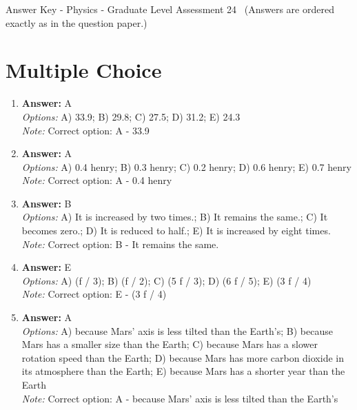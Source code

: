 \documentclass[12pt]{article}
\begin{document}
\begin{center}
Answer Key - Physics - Graduate Level Assessment 24 \
\small (Answers are ordered exactly as in the question paper.)
\end{center}

\section*{Multiple Choice}
\begin{enumerate}[label=\arabic*.]
\item \textbf{Answer:} A
\\ \textit{Options:} A) 33.9; B) 29.8; C) 27.5; D) 31.2; E) 24.3
\\ \textit{Note:} Correct option: A - 33.9
\item \textbf{Answer:} A
\\ \textit{Options:} A) 0.4 henry; B) 0.3 henry; C) 0.2 henry; D) 0.6 henry; E) 0.7 henry
\\ \textit{Note:} Correct option: A - 0.4 henry
\item \textbf{Answer:} B
\\ \textit{Options:} A) It is increased by two times.; B) It remains the same.; C) It becomes zero.; D) It is reduced to half.; E) It is increased by eight times.
\\ \textit{Note:} Correct option: B - It remains the same.
\item \textbf{Answer:} E
\\ \textit{Options:} A) (f / 3); B) (f / 2); C) (5 f / 3); D) (6 f / 5); E) (3 f / 4)
\\ \textit{Note:} Correct option: E - (3 f / 4)
\item \textbf{Answer:} A
\\ \textit{Options:} A) because Mars' axis is less tilted than the Earth's; B) because Mars has a smaller size than the Earth; C) because Mars has a slower rotation speed than the Earth; D) because Mars has more carbon dioxide in its atmosphere than the Earth; E) because Mars has a shorter year than the Earth
\\ \textit{Note:} Correct option: A - because Mars' axis is less tilted than the Earth's
\end{enumerate}
\end{document}

